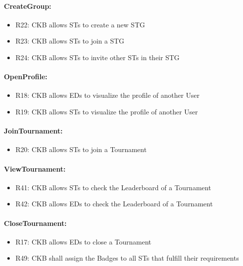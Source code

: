 \paragraph{CreateGroup:}
\begin{itemize}
    \item R22: CKB allows STs to create a new STG 
    \item R23: CKB allows STs to join a STG 
    \item R24: CKB allows STs to invite other STs in their STG
\end{itemize}


\paragraph{OpenProfile:}
\begin{itemize}
    \item R18: CKB allows EDs to visualize the profile of another User 
    \item R19: CKB allows STs to visualize the profile of another User
\end{itemize}


\paragraph{JoinTournament:}
\begin{itemize}
    \item R20: CKB allows STs to join a Tournament 
\end{itemize}


\paragraph{ViewTournament:}
\begin{itemize}
    \item R41: CKB allows STs to check the Leaderboard of a Tournament 
    \item R42: CKB allows EDs to check the Leaderboard of a Tournament
\end{itemize}


\paragraph{CloseTournament:}
\begin{itemize}
    \item R17: CKB allows EDs to close a Tournament 
    \item R49: CKB shall assign the Badges to all STs that fulfill their requirements 
\end{itemize}


